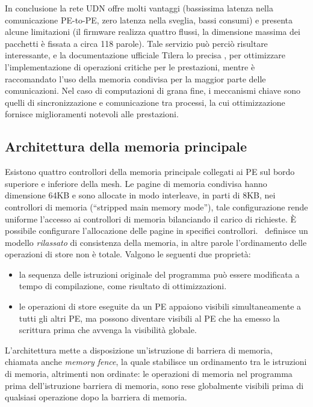 In conclusione la rete UDN offre molti vantaggi (bassissima latenza nella comunicazione PE-to-PE, zero latenza nella sveglia, bassi consumi) e presenta alcune limitazioni (il firmware realizza quattro flussi, la dimensione massima dei pacchetti \`e fissata a circa 118 parole). Tale servizio pu\`o perci\`o risultare interessante, e la documentazione ufficiale Tilera lo precisa \cite{ug205}, per ottimizzare l'implementazione di operazioni critiche per le prestazioni, mentre \`e raccomandato l'uso della memoria condivisa per la maggior parte delle comunicazioni. Nel caso di computazioni di grana fine, i meccanismi chiave sono quelli di sincronizzazione e comunicazione tra processi, la cui ottimizzazione fornisce miglioramenti notevoli alle prestazioni.

\subsection{Architettura della memoria principale}
\label{sct:intro_arch_memory}
Esistono quattro controllori della memoria principale collegati ai PE sul bordo superiore e inferiore della mesh. Le pagine di memoria condivisa hanno dimensione 64KB e sono allocate in modo interleave, in parti di 8KB, nei controllori di memoria (``stripped main memory mode''), tale configurazione rende uniforme l'accesso ai controllori di memoria bilanciando il carico di richieste. \`E possibile configurare l'allocazione delle pagine in specifici controllori. \tile\ definisce un modello \emph{rilassato} di consistenza della memoria, in altre parole l'ordinamento delle operazioni di store non \`e totale. Valgono le seguenti due propriet\`a:
\begin{itemize}
  \item la sequenza delle istruzioni originale del programma pu\`o essere modificata a tempo di compilazione, come risultato di ottimizzazioni. 
\item le operazioni di store eseguite da un PE appaiono visibili simultaneamente a tutti gli altri PE, ma possono diventare visibili al PE che ha emesso la scrittura prima che avvenga la visibilit\`a globale.
\end{itemize}       
L'architettura mette a disposizione un'istruzione di barriera di memoria, chiamata anche \emph{memory fence}, la quale stabilisce un ordinamento tra le istruzioni di memoria, altrimenti non ordinate: le operazioni di memoria nel programma prima dell'istruzione barriera di memoria, sono rese globalmente visibili prima di qualsiasi operazione dopo la barriera di memoria.

